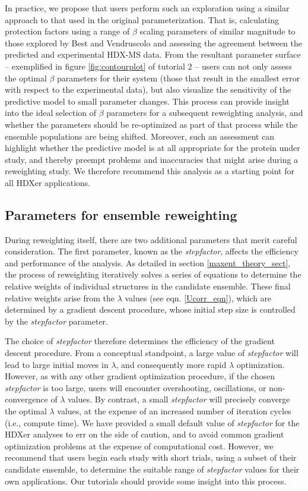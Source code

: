 \documentclass[9pt,tutorial]{livecoms}
\begin{document}
In practice, we propose that users perform such an exploration using a similar approach to that used in the original parameterization.
That is, calculating protection factors using a range of $\beta$ scaling parameters of similar magnitude to those explored by Best and Vendruscolo and assessing the agreement between the predicted and experimental HDX-MS data.
From the resultant parameter surface -- exemplified in figure \ref{fig:contourplot} of tutorial 2 -- users can not only assess the optimal $\beta$ parameters for their system (those that result in the smallest error with respect to the experimental data), but also visualize the sensitivity of the predictive model to small parameter changes.
This process can provide insight into the ideal selection of $\beta$ parameters for a subsequent reweighting analysis, and whether the parameters should be re-optimized as part of that process while the ensemble populations are being shifted.
Moreover, such an assessment can highlight whether the predictive model is at all appropriate for the protein under study, and thereby preempt problems and inaccuracies that might arise during a reweighting study.
We therefore recommend this analysis as a starting point for all HDXer applications.

\subsection{Parameters for ensemble reweighting}
During reweighting itself, there are two additional parameters that merit careful consideration.
The first parameter, known as the \textit{stepfactor}, affects the efficiency and performance of the analysis. 
As detailed in section \ref{maxent_theory_sect}, the process of reweighting iteratively solves a series of equations to determine the relative weights of individual structures in the candidate ensemble.
These final relative weights arise from the $\lambda$ values (see eqn. \ref{Ucorr_eqn}), which are determined by a gradient descent procedure, whose initial step size is controlled by the \textit{stepfactor} parameter.

The choice of \textit{stepfactor} therefore determines the efficiency of the gradient descent procedure.
From a conceptual standpoint, a large value of \textit{stepfactor} will lead to large initial moves in $\lambda$, and consequently more rapid $\lambda$ optimization.
However, as with any other gradient optimization procedure, if the chosen \textit{stepfactor} is too large, users will encounter overshooting, oscillations, or non-convergence of $\lambda$ values.
By contrast, a small \textit{stepfactor} will precisely converge the optimal $\lambda$ values, at the expense of an increased number of iteration cycles (i.e., compute time).
We have provided a small default value of \textit{stepfactor} for the HDXer analyses to err on the side of caution, and to avoid common gradient optimization problems at the expense of computational cost.
However, we recommend that users begin each study with short trials, using a subset of their candidate ensemble, to determine the suitable range of \textit{stepfactor} values for their own applications.
Our tutorials should provide some insight into this process.
\end{document}
